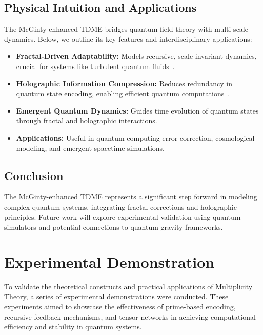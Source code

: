 \documentclass{article}
\theoremstyle{plain}
\begin{document}
\subsection{Physical Intuition and Applications}
The McGinty-enhanced TDME bridges quantum field theory with multi-scale dynamics. Below, we outline its key features and interdisciplinary applications:
\begin{itemize}
    \item \textbf{Fractal-Driven Adaptability:} Models recursive, scale-invariant dynamics, crucial for systems like turbulent quantum fluids~\cite{Frisch1995}.
    \item \textbf{Holographic Information Compression:} Reduces redundancy in quantum state encoding, enabling efficient quantum computations~\cite{Susskind1995}.
    \item \textbf{Emergent Quantum Dynamics:} Guides time evolution of quantum states through fractal and holographic interactions.
    \item \textbf{Applications:} Useful in quantum computing error correction, cosmological modeling, and emergent spacetime simulations.
\end{itemize}

\subsection{Conclusion}
The McGinty-enhanced TDME represents a significant step forward in modeling complex quantum systems, integrating fractal corrections and holographic principles. Future work will explore experimental validation using quantum simulators and potential connections to quantum gravity frameworks.

\section{Experimental Demonstration}

To validate the theoretical constructs and practical applications of Multiplicity Theory, a series of experimental demonstrations were conducted. These experiments aimed to showcase the effectiveness of prime-based encoding, recursive feedback mechanisms, and tensor networks in achieving computational efficiency and stability in quantum systems.
\end{document}
